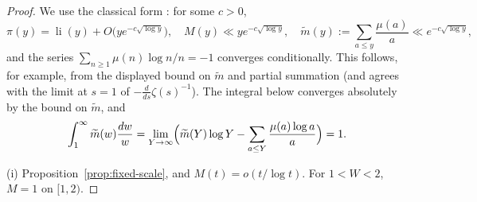 \documentclass[11pt,reqno]{amsart}
\numberwithin{equation}{section}
\theoremstyle{plain}
\theoremstyle{definition}
\theoremstyle{remark}
\DeclareMathOperator{\li}{li}
\newcommand{\mt}{\widetilde{m}}
\begin{document}
\begin{proof}
We use the classical form \cite{MontgomeryVaughan2007}: for some $c>0$,
\begin{equation}
\label{eq:pnt_inputs}
  \pi(y)=\li(y)+O\bigl(ye^{-c\sqrt{\log y}}\bigr),\quad
  M(y)\ll ye^{-c\sqrt{\log y}},\quad
  \mt(y):=\sum_{a\le y}\frac{\mu(a)}a\ll e^{-c\sqrt{\log y}},
\end{equation}
and the series
$\sum_{n\ge1}\mu(n)\log n/n=-1$ converges conditionally.  This follows,
for example, from the displayed bound on $\mt$ and partial summation (and
agrees with the limit at $s=1$ of
$-\frac{d}{ds}\zeta(s)^{-1}$).  The integral below converges absolutely by
the bound on $\mt$, and
\begin{equation}
\label{eq:mtilde_integral}
  \int_1^\infty\mt(w)\frac{dw}w
  =\lim_{Y\to\infty}\Bigl(\mt(Y)\log Y-\sum_{a\le Y}\frac{\mu(a)\log a}a\Bigr)=1.
\end{equation}

(i) Proposition~\ref{prop:fixed-scale}, and $M(t)=o(t/\log t)$. For
$1<W<2$, $M=1$ on $[1,2)$.


\end{proof}
\end{document}
